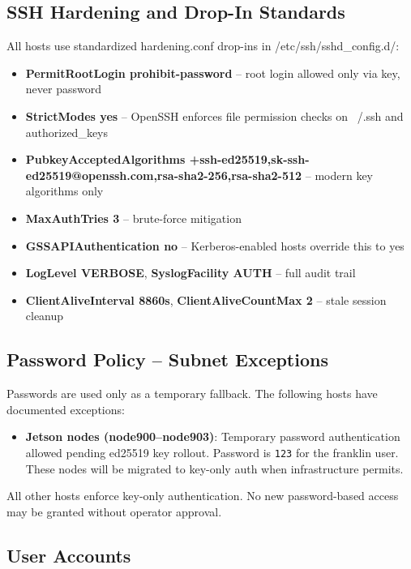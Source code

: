 \subsection{SSH Hardening and Drop-In Standards}

All hosts use standardized hardening.conf drop-ins in /etc/ssh/sshd\_config.d/:

\begin{itemize}
  \item \textbf{PermitRootLogin prohibit-password} -- root login allowed only via key, never password
  \item \textbf{StrictModes yes} -- OpenSSH enforces file permission checks on ~/.ssh and authorized\_keys
  \item \textbf{PubkeyAcceptedAlgorithms +ssh-ed25519,sk-ssh-ed25519@openssh.com,rsa-sha2-256,rsa-sha2-512} -- modern key algorithms only
  \item \textbf{MaxAuthTries 3} -- brute-force mitigation
  \item \textbf{GSSAPIAuthentication no} -- Kerberos-enabled hosts override this to yes
  \item \textbf{LogLevel VERBOSE}, \textbf{SyslogFacility AUTH} -- full audit trail
  \item \textbf{ClientAliveInterval 8860s}, \textbf{ClientAliveCountMax 2} -- stale session cleanup
\end{itemize}

\subsection{Password Policy -- Subnet Exceptions}

Passwords are used only as a temporary fallback. The following hosts have documented exceptions:

\begin{itemize}
  \item \textbf{Jetson nodes (node900--node903)}: Temporary password authentication allowed pending ed25519 key rollout. Password is \texttt{123} for the franklin user. These nodes will be migrated to key-only auth when infrastructure permits.
\end{itemize}

All other hosts enforce key-only authentication. No new password-based access may be granted without operator approval.

\subsection{User Accounts}

